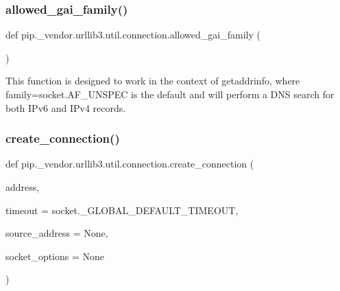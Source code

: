 \subsubsection{\texorpdfstring{allowed\+\_\+gai\+\_\+family()}{allowed\_gai\_family()}}
{\footnotesize\ttfamily def pip.\+\_\+vendor.\+urllib3.\+util.\+connection.\+allowed\+\_\+gai\+\_\+family (\begin{DoxyParamCaption}{ }\end{DoxyParamCaption})}

\begin{DoxyVerb}This function is designed to work in the context of
getaddrinfo, where family=socket.AF_UNSPEC is the default and
will perform a DNS search for both IPv6 and IPv4 records.\end{DoxyVerb}
 \mbox{\label{namespacepip_1_1__vendor_1_1urllib3_1_1util_1_1connection_a5e050e8da1c17c682e25e14dacde39f0}} 
\subsubsection{\texorpdfstring{create\+\_\+connection()}{create\_connection()}}
{\footnotesize\ttfamily def pip.\+\_\+vendor.\+urllib3.\+util.\+connection.\+create\+\_\+connection (\begin{DoxyParamCaption}\item[{}]{address,  }\item[{}]{timeout = {\ttfamily socket.\+\_\+GLOBAL\+\_\+DEFAULT\+\_\+TIMEOUT},  }\item[{}]{source\+\_\+address = {\ttfamily None},  }\item[{}]{socket\+\_\+options = {\ttfamily None} }\end{DoxyParamCaption})}

